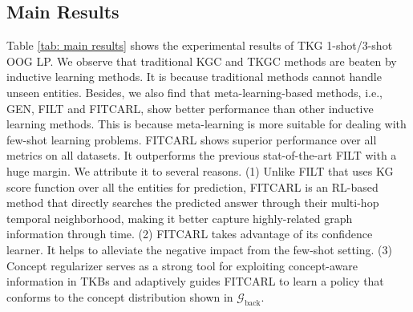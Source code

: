 \documentclass[runningheads]{llncs}
\begin{document}
\subsection{Main Results}
\label{sec: main results}
Table \ref{tab: main results} shows the experimental results of TKG 1-shot/3-shot OOG LP. We observe that traditional KGC and TKGC methods are beaten by inductive learning methods. It is because traditional methods cannot handle unseen entities. Besides, we also find that meta-learning-based methods, i.e., GEN, FILT and FITCARL, show better performance than other inductive learning methods. This is because meta-learning is more suitable for dealing with few-shot learning problems. 
FITCARL shows superior performance over all metrics on all datasets. It outperforms the previous stat-of-the-art FILT with a huge margin. 
We attribute it to several reasons. (1) Unlike FILT that uses KG score function over all the entities for prediction, FITCARL is an RL-based method that directly searches the predicted answer through their multi-hop temporal neighborhood, making it better capture highly-related graph information through time. (2) FITCARL takes advantage of its confidence learner. It helps to alleviate the negative impact from the few-shot setting. (3) Concept regularizer serves as a strong tool for exploiting concept-aware information in TKBs and adaptively guides FITCARL to learn a policy that conforms to the concept distribution shown in $\mathcal{G}_{\text{back}}$.
\end{document}

